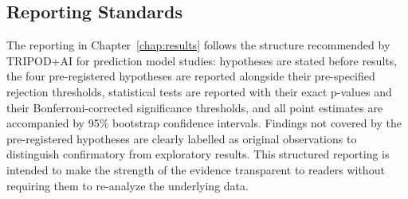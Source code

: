 \subsection{Reporting Standards}
\label{subsec:met-repro-reporting}

The reporting in Chapter~\ref{chap:results} follows the structure 
recommended by TRIPOD+AI for prediction model studies: hypotheses are 
stated before results, the four pre-registered hypotheses are reported 
alongside their pre-specified rejection thresholds, statistical tests 
are reported with their exact p-values and their Bonferroni-corrected 
significance thresholds, and all point estimates are accompanied by 
95\% bootstrap confidence intervals. Findings not covered by the 
pre-registered hypotheses are clearly labelled as original observations 
to distinguish confirmatory from exploratory results. This structured 
reporting is intended to make the strength of the evidence transparent 
to readers without requiring them to re-analyze the underlying data.